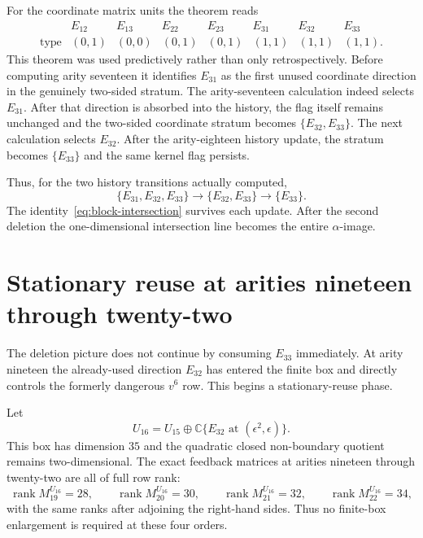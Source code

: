 \documentclass[11pt]{amsart}
\newcommand{\rank}{\operatorname{rank}}
\newcommand{\C}{\mathbb C}
\begin{document}
For the coordinate matrix units the theorem reads
\[
\begin{array}{c|ccccccc}
& E_{12}&E_{13}&E_{22}&E_{23}&E_{31}&E_{32}&E_{33}\\
\hline
\text{type}&(0,1)&(0,0)&(0,1)&(0,1)&(1,1)&(1,1)&(1,1).
\end{array}
\]
This theorem was used predictively rather than only retrospectively.  Before computing arity seventeen it identifies $E_{31}$ as the first unused coordinate direction in the genuinely two-sided stratum.  The arity-seventeen calculation indeed selects $E_{31}$.  After that direction is absorbed into the history, the flag itself remains unchanged and the two-sided coordinate stratum becomes $\{E_{32},E_{33}\}$.  The next calculation selects $E_{32}$.  After the arity-eighteen history update, the stratum becomes $\{E_{33}\}$ and the same kernel flag persists.

Thus, for the two history transitions actually computed,
\begin{equation}\label{eq:deletion-dynamics}
\boxed{
\{E_{31},E_{32},E_{33}\}
\longrightarrow
\{E_{32},E_{33}\}
\longrightarrow
\{E_{33}\}.
}
\end{equation}
The identity~\eqref{eq:block-intersection} survives each update.  After the second deletion the one-dimensional intersection line becomes the entire $\alpha$-image.

\section{Stationary reuse at arities nineteen through twenty-two}\label{sec:stationary-reuse}

The deletion picture does not continue by consuming $E_{33}$ immediately.  At arity nineteen the already-used direction $E_{32}$ has entered the finite box and directly controls the formerly dangerous $v^6$ row.  This begins a stationary-reuse phase.

Let
\[
U_{16}=U_{15}\oplus\C\{E_{32}\text{ at }(\epsilon^2,\epsilon)\}.
\]
This box has dimension $35$ and the quadratic closed non-boundary quotient remains two-dimensional.  The exact feedback matrices at arities nineteen through twenty-two are all of full row rank:
\[
\rank M_{19}^{U_{16}}=28,
\qquad
\rank M_{20}^{U_{16}}=30,
\qquad
\rank M_{21}^{U_{16}}=32,
\qquad
\rank M_{22}^{U_{16}}=34,
\]
with the same ranks after adjoining the right-hand sides.  Thus no finite-box enlargement is required at these four orders.
\end{document}
